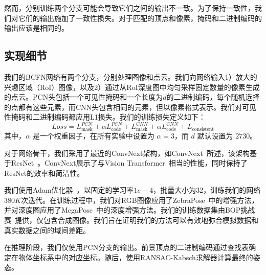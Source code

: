 然而，分别训练两个分支可能会导致它们之间的输出不一致。为了保持一致性，我们对它们的输出施加了一致性损失。对于匹配的顶点和像素，掩码和二进制编码的输出应该是相同的。

\subsection{实现细节}

我们的BCFN网络有两个分支，分别处理图像和点云。我们向网络输入1）放大的兴趣区域（RoI）图像，以及2）通过从RoI深度图中均匀采样固定数量的像素生成的点云。PCN头包括一个可见性掩码和一个长度为$d$的二进制编码，每个随机选择的点都有这些元素，而CNN头包含相同的元素，但以像素格式表示。我们对可见性掩码和二进制编码都应用L1损失。我们的训练损失定义如下：
\begin{equation}
Loss = L_\text{mask}^{PCN} + \alpha L_\text{code}^{PCN} + L_\text{mask}^{CNN} + \alpha L_\text{code}^{CNN} + L_{\text{consistent}}
\end{equation}
其中，$\alpha$ 是一个权重因子，在所有实验中设置为 $\alpha = 3$，而 $d$ 默认设置为 $2730$。

对于网络骨干，我们采用了最近的ConvNext架构，如ConvNext~\cite{Liu2022ACF}所述，该架构基于ResNet~\cite{He2015DeepRL}。ConvNext展示了与Vision Transformer~\cite{Dosovitskiy2020AnII}相当的性能，同时保持了ResNet的效率和简洁性。

我们使用Adam优化器~\cite{Kingma2014AdamAM}，以固定的学习率$1e-4$，批量大小为32，训练我们的网络$380K$次迭代。在训练过程中，我们对RGB图像应用了ZebraPose~\cite{su2022zebrapose}中的增强方法，并对深度图应用了MegaPose~\cite{Labbe2022MegaPose6P}中的深度增强方法。我们的训练数据集由BOP挑战赛~\cite{hodan2024bop}提供，仅包含合成图像。我们旨在证明我们的方法可以有效地弥合模拟数据和真实数据之间的域间差距。

在推理阶段，我们仅使用PCN分支的输出。前景顶点的二进制编码通过查找表确定在物体坐标系中的对应坐标。随后，使用RANSAC-Kabsch求解器计算最终的姿态。